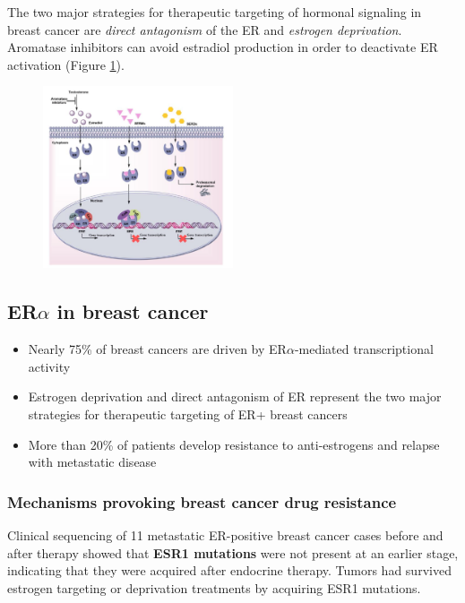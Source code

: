 The two major strategies for therapeutic targeting of hormonal signaling in breast cancer are \emph{direct antagonism} of the ER and \emph{estrogen deprivation}. Aromatase inhibitors can avoid estradiol production in order to deactivate ER activation (Figure \ref{fig:strategies}).

\begin{figure}
\centering
\includegraphics[width=0.5\textwidth]{../_resources/Screen_Shot_2022-11-18_at_11-14-09.png}
\caption{}
\label{fig:strategies}
\end{figure}


\subsection{ER$\alpha$ in breast cancer}

\begin{itemize}
\tightlist
\item
  Nearly 75\% of breast cancers are driven by ER$\alpha$-mediated transcriptional activity
\item
  Estrogen deprivation and direct antagonism of ER represent the two major strategies for therapeutic targeting of ER+ breast cancers
\item
  More than 20\% of patients develop resistance to anti-estrogens and relapse with metastatic disease
\end{itemize}

\hypertarget{mechanisms-provoking-breast-cancer-drug-resistance}{%
\subsubsection{Mechanisms provoking breast cancer drug resistance}\label{mechanisms-provoking-breast-cancer-drug-resistance}}

Clinical sequencing of 11 metastatic ER-positive breast cancer cases before and after therapy showed that \textbf{ESR1 mutations} were not present at an earlier stage, indicating that they were acquired after endocrine therapy. Tumors had survived estrogen targeting or deprivation treatments by acquiring ESR1 mutations.


